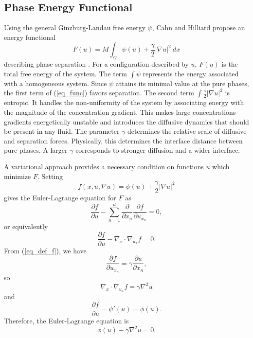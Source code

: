 \documentclass[12pt, reqno]{report}
\theoremstyle{definition}
\theoremstyle{remark}
\begin{document}
\subsection{Phase Energy Functional}

Using the general Ginzburg-Landau free energy $\psi$, Cahn and Hilliard propose an energy functional 
\begin{equation} \label{eq_func}
    F(u)=M\int_{\Omega}\psi(u)+ \frac{\gamma}{2}|\nabla u|^{2}~dx
\end{equation}
describing phase separation \cite{cahn_1958_free}.
For a configuration described by $u$, $F(u)$ is the total free energy of the system. 
The term $\int\psi$ represents the energy associated with a homogeneous system.
Since $\psi$ attains its minimal value at the pure phases, the first term of (\ref{eq_func}) favors separation.
The second term $\int\frac{\gamma}{2}|\nabla u|^2$ is entropic.
It handles the non-uniformity of the system by associating energy with the magnitude of the concentration gradient.
This makes large concentrations gradients energetically unstable and introduces the diffusive dynamics that should be present in any fluid.
The parameter $\gamma$ determines the relative scale of diffusive and separation forces.
Physically, this determines the interface distance between pure phases.
A larger $\gamma$ corresponds to stronger diffusion and a wider interface.

A variational approach provides a necessary condition on functions $u$ which minimize $F$. Setting 
\begin{equation} \label{eq_def_f}
    f(x,u,\nabla u)=\psi(u)+ \frac{\gamma}{2}|\nabla u|^{2}
\end{equation}
gives the Euler-Lagrange equation for $F$ as
\begin{equation} \label{eq_EL1}
    \frac{\partial f}{\partial u}-\sum_{n=1}^{d}\frac{\partial }{\partial x_{n}}\frac{\partial f}{\partial u_{x_{n}}}=0,
\end{equation}
or equivalently
\begin{equation} 
    \frac{\partial f}{\partial u}-\nabla_{x}\cdot\nabla_{u_{x}}f=0.
\end{equation}
From (\ref{eq_def_f}), we have
\begin{equation} 
    \frac{\partial f}{\partial u_{x_{n}}}=\gamma\frac{\partial u}{\partial x_{n}},
\end{equation}
so
\begin{equation} 
    \nabla_{x}\cdot\nabla_{u_{x}}f=\gamma\nabla^{2}u
\end{equation}
and 
\begin{equation} 
    \frac{\partial f}{\partial u}=\psi'(u)=\phi(u).
\end{equation}
Therefore, the Euler-Lagrange equation is 
\begin{equation} \label{eq_EL}
    \phi(u)-\gamma\nabla^{2}u=0.
\end{equation}
\end{document}
